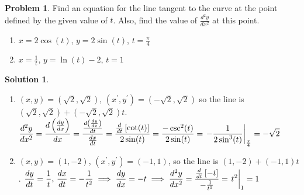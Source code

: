 \documentclass[10pt]{article}
\theoremstyle{definition}
\newtheorem{problem}{Problem}
\newtheorem{soln}{Solution}
\begin{document}
\begin{problem} Find an equation for the line tangent to the curve at the point defined by the given value of $t$. Also, find the value of $\displaystyle\frac{d^2y}{dx^2}$ at this point.
  \begin{enumerate}[label=(\alph*)]
    \item $x=2\cos(t)$, \qquad $y=2\sin(t)$, \qquad $t=\frac{\pi}{4}$
    \item $x=\frac{1}{t}$, \qquad $y=\ln(t)-2$, \qquad $t=1$
  \end{enumerate}
\end{problem}
\begin{soln}~
  \begin{enumerate}[label=(\alph*)]
    \item $(x,y)=\left(\sqrt{2},\sqrt{2}\right)$, $\left(x^\prime,y^\prime\right)=\left(-\sqrt{2}, \sqrt{2}\right)$ so the line is $\left(\sqrt{2},\sqrt{2}\right)+\left(-\sqrt{2}, \sqrt{2}\right)t$.
    $\displaystyle\frac{d^2y}{dx^2}=\frac{d\left(\frac{dy}{dx}\right)}{dx}=\frac{\frac{d\left(\frac{dy}{dx}\right)}{dt}}{\frac{dx}{dt}}=
    \frac{\frac{d}{dt}\left[\cot(t)\right]}{2\sin(t)}=\frac{-\csc^2(t)}{2\sin(t)}=\eval{-\frac{1}{2\sin^3(t)}}_{\frac{\pi}{4}}=-\sqrt{2}$
    \item $(x,y)=(1,-2)$, $(x^\prime,y^\prime)=(-1, 1)$, so the line is $(1,-2)+(-1, 1)t$. $\displaystyle\frac{dy}{dt}=\frac{1}{t},\,\frac{dx}{dt}=-\frac{1}{t^2}\implies \frac{dy}{dx}=-t\implies 
    \frac{d^2y}{dx^2}=\frac{\frac{d}{dt}\left[-t\right]}{-\frac{1}{t^2}}=\eval{t^2}_{1}=1$
  \end{enumerate}
\end{soln}
\end{document}
